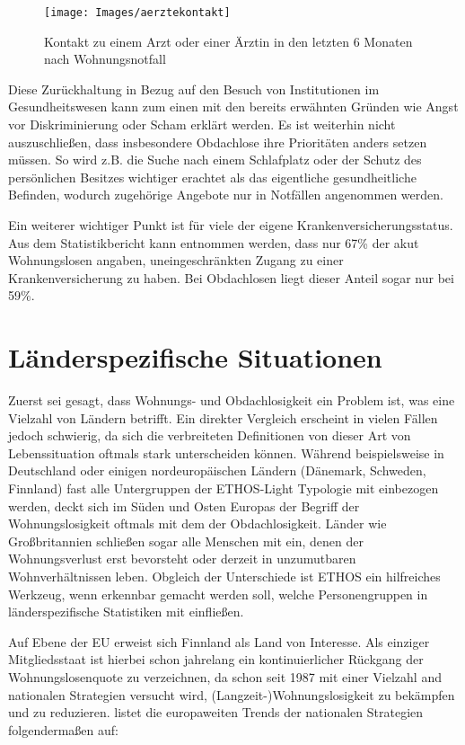 \begin{figure}[h]
	\centering
	\texttt{[image: Images/aerztekontakt]}
	\caption[Ärztekontakt nach Wohnungsnotfall]{Kontakt zu einem Arzt oder einer Ärztin in den letzten 6 Monaten nach Wohnungsnotfall \citep{BAGW.2022}}
	\label{fig:aerztekontakt}
\end{figure}

Diese Zurückhaltung in Bezug auf den Besuch von Institutionen im Gesundheitswesen kann zum einen mit den bereits erwähnten Gründen wie Angst vor Diskriminierung oder Scham \citep{Kaduszkiewicz.2017} erklärt werden. Es ist weiterhin nicht auszuschließen, dass insbesondere Obdachlose ihre Prioritäten anders setzen müssen. So wird z.B. die Suche nach einem Schlafplatz oder der Schutz des persönlichen Besitzes wichtiger erachtet als das eigentliche gesundheitliche Befinden, wodurch zugehörige Angebote nur in Notfällen angenommen werden.

Ein weiterer wichtiger Punkt ist für viele der eigene Krankenversicherungsstatus. Aus dem Statistikbericht kann entnommen werden, dass nur 67\% der akut Wohnungslosen angaben, uneingeschränkten Zugang zu einer Krankenversicherung zu haben. Bei Obdachlosen liegt dieser Anteil sogar nur bei 59\%.

\section{Länderspezifische Situationen}

Zuerst sei gesagt, dass Wohnungs- und Obdachlosigkeit ein Problem ist, was eine Vielzahl von Ländern betrifft. Ein direkter Vergleich erscheint in vielen Fällen jedoch schwierig, da sich die verbreiteten Definitionen von dieser Art von Lebenssituation oftmals stark unterscheiden können. Während beispielsweise in Deutschland oder einigen nordeuropäischen Ländern (Dänemark, Schweden, Finnland) fast alle Untergruppen der ETHOS-Light Typologie mit einbezogen werden, deckt sich im Süden und Osten Europas der Begriff der Wohnungslosigkeit oftmals mit dem der Obdachlosigkeit. Länder wie Großbritannien schließen sogar alle Menschen mit ein, denen der Wohnungsverlust erst bevorsteht oder derzeit in unzumutbaren Wohnverhältnissen leben. Obgleich der Unterschiede ist ETHOS ein hilfreiches Werkzeug, wenn erkennbar gemacht werden soll, welche Personengruppen in länderspezifische Statistiken mit einfließen. \citep{Busch-Geertsema.2018}

Auf Ebene der EU erweist sich Finnland als Land von Interesse. Als einziger Mitgliedsstaat ist hierbei schon jahrelang ein kontinuierlicher Rückgang der Wohnungslosenquote zu verzeichnen, da schon seit 1987 mit einer Vielzahl and nationalen Strategien versucht wird, (Langzeit-)Wohnungslosigkeit zu bekämpfen und zu reduzieren. \citet{Busch-Geertsema.2012} listet die europaweiten Trends der nationalen Strategien folgendermaßen auf:

